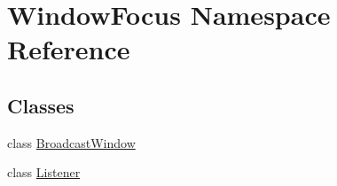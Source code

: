 \hypertarget{namespaceWindowFocus}{}\section{Window\+Focus Namespace Reference}
\label{namespaceWindowFocus}
\subsection*{Classes}
\begin{DoxyCompactItemize}
\item 
class \mbox{\hyperlink{classWindowFocus_1_1BroadcastWindow}{Broadcast\+Window}}
\item 
class \mbox{\hyperlink{classWindowFocus_1_1Listener}{Listener}}
\end{DoxyCompactItemize}
